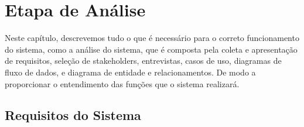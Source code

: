 
\chapter{Etapa de An\'{a}lise}

Neste capítulo, descrevemos tudo o que é necessário para o correto funcionamento do sistema, como a análise do sistema, que é composta pela coleta e apresentação de requisitos, seleção de stakeholders, entrevistas, casos de uso, diagramas de fluxo de dados, e diagrama de entidade e relacionamentos. De modo a  proporcionar o entendimento das funções que o sistema realizará.



\section{Requisitos do Sistema}







